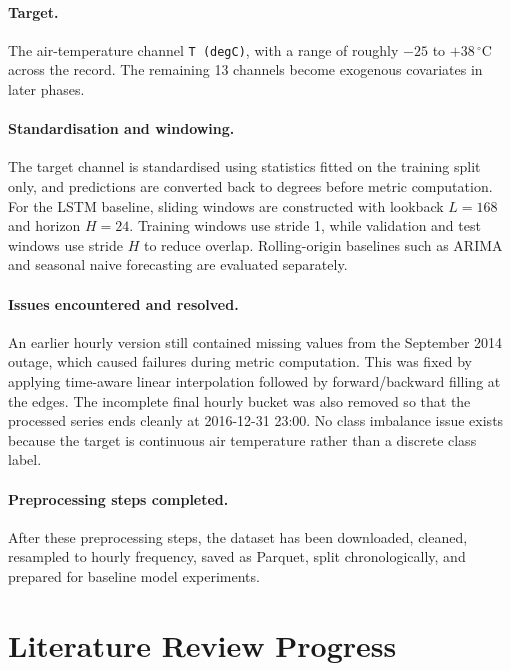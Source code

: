 \documentclass[11pt,a4paper]{article}
\begin{document}
\paragraph{Target.}
The air-temperature channel \texttt{T (degC)}, with a
range of roughly $-25$ to $+38$\,$^{\circ}$C across the record. The
remaining 13 channels become exogenous covariates in later phases.

\paragraph{Standardisation and windowing.}
The target channel is standardised using statistics fitted on the training split only, and predictions are converted back to degrees before metric computation. For the LSTM baseline, sliding windows are constructed with lookback $L=168$ and horizon $H=24$. Training windows use stride 1, while validation and test windows use stride $H$ to reduce overlap. Rolling-origin baselines such as ARIMA and seasonal naive forecasting are evaluated separately.

\paragraph{Issues encountered and resolved.}
An earlier hourly version still contained missing values from the September 2014 outage, which caused failures during metric computation. This was fixed by applying time-aware linear interpolation followed by forward/backward filling at the edges. The incomplete final hourly bucket was also removed so that the processed series ends cleanly at 2016-12-31 23:00. No class imbalance issue exists because the target is continuous air temperature rather than a discrete class label.

\paragraph{Preprocessing steps completed.}
After these preprocessing steps, the dataset has been downloaded, cleaned, resampled to hourly frequency, saved as Parquet, split chronologically, and prepared for baseline model experiments.

\section{Literature Review Progress}
\end{document}
